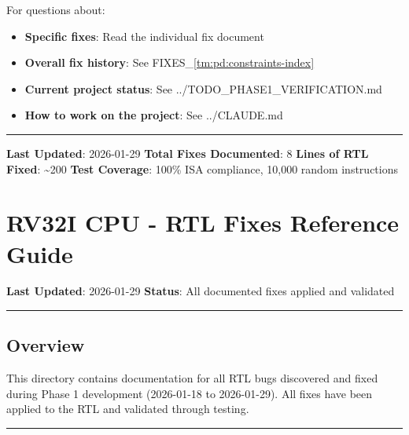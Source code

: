 \begin{record}

For questions about:

\begin{itemize}
\tightlist
\item
  \textbf{Specific fixes}: Read the individual fix document
\item
  \textbf{Overall fix history}: See FIXES\_\allowbreak{}\cref{tm:pd:constraints-index}
\item
  \textbf{Current project status}: See
  ../\allowbreak{}TODO\_\allowbreak{}PHASE1\_\allowbreak{}VERIFICATION.md
\item
  \textbf{How to work on the project}: See ../\allowbreak{}CLAUDE.md
\end{itemize}

\begin{center}\rule{0.5\linewidth}{0.5pt}\end{center}

\textbf{Last Updated}: 2026-01-29 \textbf{Total Fixes Documented}: 8
\textbf{Lines of RTL Fixed}: \textasciitilde200 \textbf{Test Coverage}:
100\% ISA compliance, 10,000 random instructions

\end{record}

\section{RV32I CPU - RTL Fixes Reference Guide}\label{cr:fix:fixes-index}

\begin{record}

\textbf{Last Updated}: 2026-01-29 \textbf{Status}: All documented fixes
applied and validated

\begin{center}\rule{0.5\linewidth}{0.5pt}\end{center}

\end{record}

\subsection{Overview}\label{cr:fix:fixes-index:overview}

\begin{record}

This directory contains documentation for all RTL bugs discovered and
fixed during Phase 1 development (2026-01-18 to 2026-01-29). All fixes
have been applied to the RTL and validated through testing.

\begin{center}\rule{0.5\linewidth}{0.5pt}\end{center}

\end{record}

